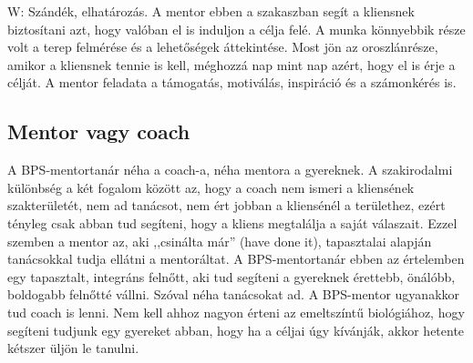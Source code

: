 W: Szándék, elhatározás. A mentor ebben a szakaszban segít a kliensnek
biztosítani azt, hogy valóban el is induljon a célja felé. A munka
könnyebbik része volt a terep felmérése és a lehetőségek
áttekintése.
Most jön az oroszlánrésze, amikor a kliensnek tennie is kell, méghozzá
nap mint nap azért, hogy el is érje a célját. A mentor feladata a
támogatás, motiválás, inspiráció és a számonkérés is.

\hypertarget{mentor-vagy-coach}{%
\subsection{Mentor vagy coach}\label{mentor-vagy-coach}}

A BPS-mentortanár néha a coach-a, néha mentora a gyereknek. A szakirodalmi
különbség a két fogalom között az, hogy a coach nem ismeri a kliensének
szakterületét, nem ad tanácsot, nem ért jobban a kliensénél a
területhez, ezért tényleg csak abban tud segíteni, hogy a kliens
megtalálja a saját válaszait. Ezzel szemben a mentor az, aki ,,csinálta
már'' (have done it), tapasztalai alapján tanácsokkal tudja ellátni a
mentoráltat. A BPS-mentortanár ebben az értelemben egy tapasztalt,
integráns felnőtt, aki tud segíteni a gyereknek érettebb, önálóbb,
boldogabb felnőtté vállni. Szóval néha tanácsokat ad. A BPS-mentor
ugyanakkor tud coach is lenni. Nem kell ahhoz nagyon érteni az
emeltszíntű biológiához, hogy segíteni tudjunk egy gyereket abban, hogy
ha a céljai úgy kívánják, akkor hetente kétszer üljön le tanulni.
